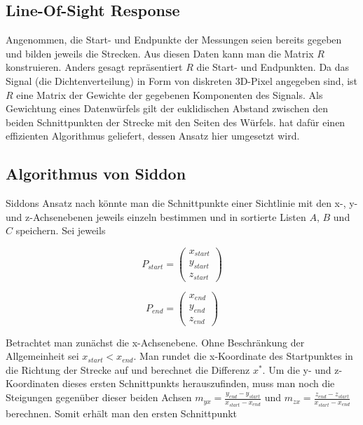 \subsection{Line-Of-Sight Response}\label{k4.2.ct.resp}

Angenommen, die Start- und Endpunkte der Messungen seien bereits gegeben und bilden jeweils die Strecken. Aus diesen Daten kann man die Matrix $R$ konstruieren. Anders gesagt repräsentiert $R$ die Start- und Endpunkten. Da das Signal (die Dichtenverteilung) in Form von diskreten 3D-Pixel angegeben sind, ist $R$ eine Matrix der Gewichte der gegebenen Komponenten des Signals. Als Gewichtung eines Datenwürfels gilt der euklidischen Abstand zwischen den beiden Schnittpunkten der Strecke mit den Seiten des Würfels. \textcite{k4.2.siddon} hat dafür einen effizienten Algorithmus geliefert, dessen Ansatz hier umgesetzt wird.


\subsection{Algorithmus von Siddon}\label{k4.2.ct.siddon}

Siddons Ansatz nach könnte man die Schnittpunkte einer Sichtlinie mit den x-, y- und z-Achsenebenen jeweils einzeln bestimmen und in sortierte Listen $A$, $B$ und $C$ speichern. Sei jeweils

\begin{equation}
  P_{start} = \begin{pmatrix}x_{start} \\ y_{start} \\ z_{start}\end{pmatrix}
\end{equation}

\begin{equation}
  P_{end} = \begin{pmatrix}x_{end} \\ y_{end} \\ z_{end}\end{pmatrix}
\end{equation}

Betrachtet man zunächst die x-Achsenebene. Ohne Beschränkung der Allgemeinheit sei $x_{start} < x_{end}$. Man rundet die x-Koordinate des Startpunktes in die Richtung der Strecke auf und berechnet die Differenz $x^{\ast}$. Um die y- und z-Koordinaten dieses ersten Schnittpunkts herauszufinden, muss man noch die Steigungen gegenüber dieser beiden Achsen $m_{yx} = \frac{y_{end} - y_{start}}{x_{start} - x_{end}}$ und $m_{zx} = \frac{z_{end} - z_{start}}{x_{start} - x_{end}}$ berechnen. Somit erhält man den ersten Schnittpunkt

